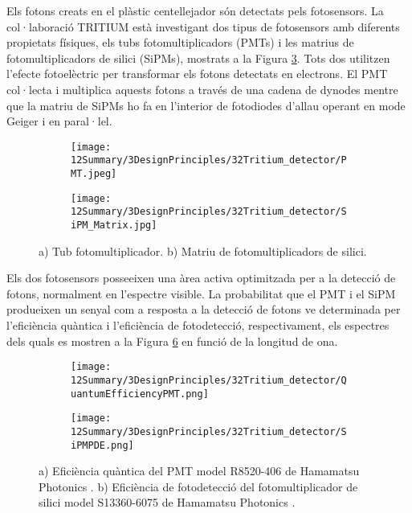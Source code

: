 Els fotons creats en el plàstic centellejador són detectats pels fotosensors. La col·laboració TRITIUM està investigant dos tipus de fotosensors amb diferents propietats físiques, els tubs fotomultiplicadors (PMTs) i les matrius de fotomultiplicadors de silici (SiPMs), mostrats a la Figura \ref{fig:Fotosensors}. Tots dos utilitzen l'efecte fotoelèctric per transformar els fotons detectats en electrons. El PMT col·lecta i multiplica aquests fotons a través de una cadena de dynodes mentre que la matriu de SiPMs ho fa en l'interior de fotodiodes d'allau operant en mode Geiger i en paral·lel.

\begin{figure}[htpb]
\centering
    \begin{subfigure}[b]{0.4\textwidth}
    \centering
    \texttt{[image: 12Summary/3DesignPrinciples/32Tritium\_detector/PMT.jpeg]}  
    \caption{\label{subfig:PMT}}
    \end{subfigure}
    \hfill
    \begin{subfigure}[b]{0.4\textwidth}
    \centering
    \texttt{[image: 12Summary/3DesignPrinciples/32Tritium\_detector/SiPM\_Matrix.jpg]}  
    \caption{\label{subfig:SiPM}}
    \end{subfigure}
 \caption{a) Tub fotomultiplicador. b) Matriu de fotomultiplicadors de silici.}
 \label{fig:Fotosensors}
\end{figure}

Els dos fotosensors posseeixen una àrea activa optimitzada per a la detecció de fotons, normalment en l'espectre visible. La probabilitat que el PMT i el SiPM produeixen un senyal com a resposta a la detecció de fotons ve determinada per l'eficiència quàntica i l'eficiència de fotodetecció, respectivament, els espectres dels quals es mostren a la Figura \ref{fig:EficienciaFotosensors} en funció de la longitud de ona. 

\begin{figure}[htpb]
\centering
    \begin{subfigure}[b]{0.55\textwidth}
    \centering
    \texttt{[image: 12Summary/3DesignPrinciples/32Tritium\_detector/QuantumEfficiencyPMT.png]}  
    \caption{\label{subfig:QEPMT}}
    \end{subfigure}
    \hfill
    \begin{subfigure}[b]{0.55\textwidth}
    \centering
    \texttt{[image: 12Summary/3DesignPrinciples/32Tritium\_detector/SiPMPDE.png]}  
    \caption{\label{subfig:PDESiPM}}
    \end{subfigure}
 \caption{a) Eficiència quàntica del PMT model R8520-406 de Hamamatsu Photonics \cite{DataSheetPMTs}. b) Eficiència de fotodetecció del fotomultiplicador de silici model S13360-6075 de Hamamatsu Photonics \cite{DataSheetHammamatsu_1_SiPM_1375}.}
 \label{fig:EficienciaFotosensors}
\end{figure}

